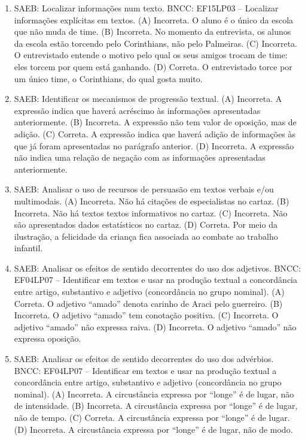 \begin{enumerate}
\item
SAEB: Localizar informações num texto. BNCC: EF15LP03 -- Localizar informações explícitas em textos. 
(A) Incorreta. O aluno é o único da escola que não muda de time. 
(B) Incorreta. No momento da entrevista, os alunos da escola estão torcendo pelo Corinthians, não pelo Palmeiras. 
(C) Incorreta. O entrevistado entende o motivo pelo qual os seus amigos trocam de time: eles torcem por quem está ganhando. 
(D) Correta. O entrevistado torce por um único time, o Corinthians, do qual gosta muito.

\item
SAEB: Identificar os mecanismos de progressão textual. 
(A) Incorreta. A expressão indica que haverá acréscimo às informações apresentadas anteriormente. 
(B) Incorreta. A expressão não tem valor de oposição, mas de adição. 
(C) Correta. A expressão indica que haverá adição de informações às que já foram apresentadas no parágrafo anterior. 
(D) Incorreta. A expressão não indica uma relação de negação com as informações apresentadas anteriormente.

\item
SAEB: Analisar o uso de recursos de persuasão em textos verbais e/ou multimodais.
(A) Incorreta. Não há citações de especialistas no cartaz. 
(B) Incorreta. Não há textos textos informativos no cartaz. 
(C) Incorreta. Não são apresentados dados estatísticos no cartaz. 
(D) Correta. Por meio da ilustração, a felicidade da criança fica associada ao combate ao trabalho infantil.

\item
SAEB: Analisar os efeitos de sentido decorrentes do uso dos adjetivos. BNCC: EF04LP07 -- Identificar em textos e usar na produção textual a concordância entre artigo, substantivo e adjetivo (concordância no grupo nominal). 
(A) Correta. O adjetivo ``amado'' denota carinho de Araci pelo guerreiro. 
(B) Incorreta. O adjetivo ``amado'' tem conotação positiva. 
(C) Incorreta. O adjetivo ``amado'' não expressa raiva. 
(D) Incorreta. O adjetivo ``amado'' não expressa oposição.

\item
SAEB: Analisar os efeitos de sentido decorrentes do uso dos advérbios. BNCC: EF04LP07 -- Identificar em textos e usar na produção textual a concordância entre artigo, substantivo e adjetivo (concordância no grupo nominal). 
(A) Incorreta. A circustância expressa por ``longe'' é de lugar, não de intensidade. 
(B) Incorreta. A circustância expressa por ``longe'' é de lugar, não de tempo. 
(C) Correta.  A circustância expressa por ``longe'' é de lugar. 
(D) Incorreta. A circustância expressa por ``longe'' é de lugar, não de modo.


\end{enumerate}
